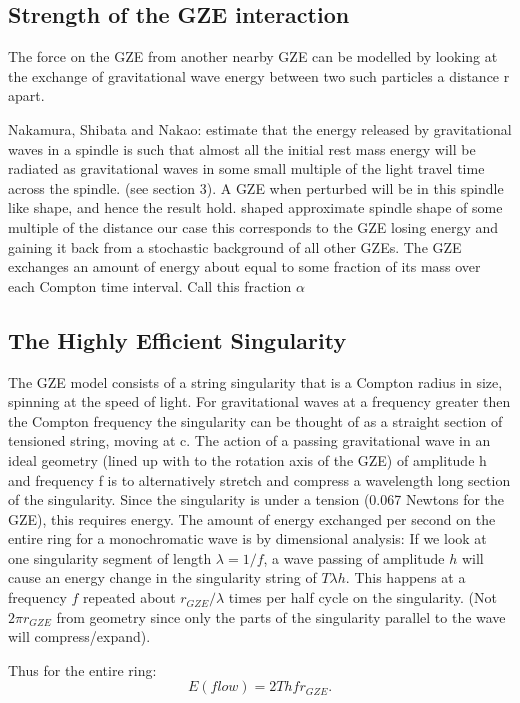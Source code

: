 \documentclass[../rzero]{subfiles}
\begin{document}
\subsection{Strength of the GZE interaction}
The force on the GZE from another nearby GZE can be modelled by looking at the exchange of gravitational wave energy between two such particles a distance r apart. 

Nakamura, Shibata and Nakao:\cite{Nakamura1993} estimate that the energy released by gravitational waves in a spindle is such that almost all the initial rest mass energy will be radiated as gravitational waves in some small multiple of the light travel time across the spindle. (see section 3). A GZE when perturbed will be in this spindle like shape, and hence the result hold. shaped approximate spindle shape of some multiple of the distance our case this corresponds to the GZE losing energy and gaining it back from a stochastic background of all other GZEs. The GZE exchanges an amount of energy about equal to some fraction of its mass over each Compton time interval. Call this fraction $\alpha$ 

\subsection{The Highly Efficient Singularity}

The GZE model consists of a string singularity that is a Compton radius in size, spinning at the speed of light. For gravitational waves at a frequency greater then the Compton frequency the singularity can be thought of as a straight section of tensioned string, moving at c. 
The action of a passing gravitational wave in an ideal geometry (lined up with to the rotation axis of the GZE) of amplitude h and frequency f is to alternatively stretch and compress a wavelength long section of the singularity. Since the singularity is under a tension (0.067 Newtons for the GZE), this requires energy.  
The amount of energy exchanged per second on the entire ring for a monochromatic wave is by dimensional analysis: 
If we look at one singularity segment of length $\lambda = 1/f$, a wave passing of amplitude $h$ will cause an energy change in the singularity string of $T \lambda h$. This happens at a frequency $f$ repeated about $ r_{GZE}/\lambda $ times per half cycle on the  singularity. (Not $2 \pi r_{GZE} $ from geometry since only the parts of the singularity parallel to the wave will compress/expand).

Thus for the entire ring:
\begin{equation}
E(flow) = 2 T h f r_{GZE}  .
\end{equation}
\end{document}
